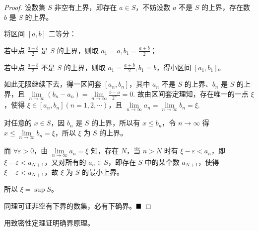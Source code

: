 \begin{proof}
    设数集 $S$ 非空有上界，即存在 $a \in S$，不妨设数 $a$ 不是 $S$ 的上界，存在数 $b$ 是 $S$ 的上界。
    
    将区间 $[a, b]$ 二等分：
    
    若中点 $\frac{a+b}{2}$ 是 $S$ 的上界，则取 $a_1 = a, b_1 = \frac{a+b}{2}$；
    
    若中点 $\frac{a+b}{2}$ 不是 $S$ 的上界，则取 $a_1 = \frac{a+b}{2}, b_1 = b$，得小区间 $[a_1, b_1]$。
    
    如此无限继续下去，得一区间套 $[a_n, b_n]$，其中 $a_n$ 不是 $S$ 的上界、$b_n$ 是 $S$ 的上界，且
     $
    \lim\limits_{n \to \infty} (b_n - a_n) = \lim\limits_{n \to \infty} \frac{b-a}{2^n} = 0.
    $
    故由区间套定理知，存在唯一的一点 $\xi$，使得 $\xi \in [a_n, b_n] (n=1,2,\cdots)$，且
     $
    \lim\limits_{n \to \infty} a_n = \lim\limits_{n \to \infty} b_n = \xi.
    $
    
    对任意的 $x \in S$，因 $b_n$ 是 $S$ 的上界，所以有 $x \leq b_n$，令 $n \to \infty$ 得 $x \leq \lim\limits_{n \to \infty} b_n = \xi$，所以 $\xi$ 为 $S$ 的上界。
    
    而 $\forall \varepsilon > 0$，由 $\lim\limits_{n \to \infty} a_n = \xi$ 知，存在 $N$，当 $n > N$ 时有 $\xi - \varepsilon < a_n$，即 $\xi - \varepsilon < a_{N+1}$，又对所有的 $a_n \in S$，即存在 $S$ 中的某个数 $a_{N+1}$，使得 $\xi - \varepsilon < a_{N+1}$，故 $\xi$ 为 $S$ 的最小上界。
    
    所以 $\xi = \sup S$。
    
    同理可证非空有下界的数集，必有下确界。$\hfill\blacksquare$
\end{proof}

\begin{problem}
    用致密性定理证明确界原理。
\end{problem}


